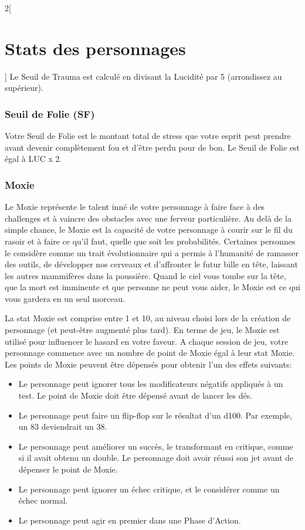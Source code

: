 \documentclass[a4paper,9pt]{article}
\begin{document}
\begin{multicols}{2}[\section{Stats des personnages} \label{sec:character-stats}]
Le Seuil de Trauma est calculé en divisant la Lucidité par 5 (arrondissez au
supérieur). 

\subsubsection{Seuil de Folie (SF)} \label{sec:insanity-rating-ir} 

Votre Seuil de Folie est le montant total de stress que votre esprit peut
prendre avant devenir complètement fou et d'être perdu pour de bon. Le Seuil de
Folie est égal à LUC x 2. 

\subsubsection{Moxie} \label{sec:moxie} 

Le Moxie représente le talent inné de votre personnage à faire face à des
challenges et à vaincre des obstacles avec une ferveur particulière. Au delà de
la simple chance, le Moxie est la capacité de votre personnage à courir sur le
fil du rasoir et à faire ce qu'il faut, quelle que soit les probabilités.
Certaines personnes le considère comme un trait évolutionnaire qui a permis à
l'humanité de ramasser des outils, de développer nos cerveaux et d'affronter le
futur bille en tête, laissant les autres mammifères dans la poussière. Quand le
ciel vous tombe sur la tête, que la mort est imminente et que personne ne peut
vous aider, le Moxie est ce qui vous gardera en un seul morceau. 

La stat Moxie est comprise entre 1 et 10, au niveau choisi lors de la création
de personnage (et peut-être augmenté plus tard). En terme de jeu, le Moxie est
utilisé pour influencer le hasard en votre faveur. A chaque session de jeu,
votre personnage commence avec un nombre de point de Moxie égal à leur stat
Moxie. Les points de Moxie peuvent être dépensés pour obtenir l'un des effets
suivants: 

\begin{itemize}
   \item Le personnage peut ignorer tous les modificateurs négatifs appliqués à
   un test. Le point de Moxie doit être dépensé avant de lancer les dés.
   \item Le personnage peut faire un flip-flop sur le résultat d'un d100. Par
   exemple, un 83 deviendrait un 38.
   \item Le personnage peut améliorer un succès, le transformant en critique,
   comme si il avait obtenu un double. Le personnage doit avoir réussi son jet
   avant de dépenser le point de Moxie.
   \item Le personnage peut ignorer un échec critique, et le considérer comme
   un échec normal.
   \item Le personnage peut agir en premier dans une Phase d'Action.
\end{itemize} 


\end{multicols}
\end{document}
